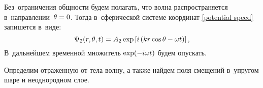  Без~ограничения общности будем полагать, что волна распространяется в~направлении~$\theta = 0$. Тогда в~сферической системе координат \eqref{potential speed} запишется в~виде:
\begin{equation}
\Psi_2(r, \theta, t) = A_2 \exp\left[i\left(kr\cos\theta - \omega t\right)\right],
\end{equation}
В~дальнейшем временной множитель $\exp(-i\omega t)$ будем опускать.

Определим отраженную от тела волну, а также найдем поля смещений в~упругом шаре и неоднородном слое.



